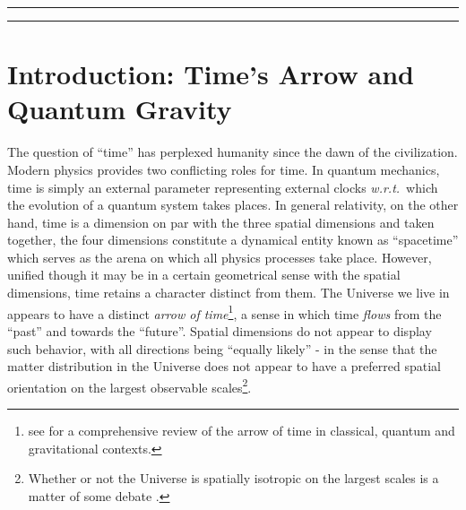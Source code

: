 \documentclass[preprint]{SciPost}
\newcommand{\wrt}{\textit{w.r.t.}~}
\theoremstyle{plain} %
\begin{document}
\vspace{10pt}
\noindent\rule{\textwidth}{1pt}
\tableofcontents\thispagestyle{fancy}
\noindent\rule{\textwidth}{1pt}
\vspace{10pt}


\section{Introduction: Time's Arrow and Quantum Gravity}\label{sec:intro}

The question of ``time'' has perplexed humanity since the dawn of the civilization. Modern physics provides two conflicting roles for time. In quantum mechanics, time is simply an external parameter representing external clocks \wrt which the evolution of a quantum system takes places. In general relativity, on the other hand, time is a dimension on par with the three spatial dimensions and taken together, the four dimensions constitute a dynamical entity known as ``spacetime'' which serves as the arena on which all physics processes take place. However, unified though it may be in a certain geometrical sense with the spatial dimensions, time retains a character distinct from them. The Universe we live in appears to have a distinct \textit{arrow of time}\footnote{see \cite{Zeh1989The-Physical} for a comprehensive review of the arrow of time in classical, quantum and gravitational contexts.}, a sense in which time \emph{flows} from the ``past'' and towards the ``future''. Spatial dimensions do not appear to display such behavior, with all directions being ``equally likely'' - in the sense that the matter distribution in the Universe does not appear to have a preferred spatial orientation on the largest observable scales\footnote{Whether or not the Universe is spatially isotropic on the largest scales is a matter of some debate \cite{Land2005Examination}.}.
\end{document}
